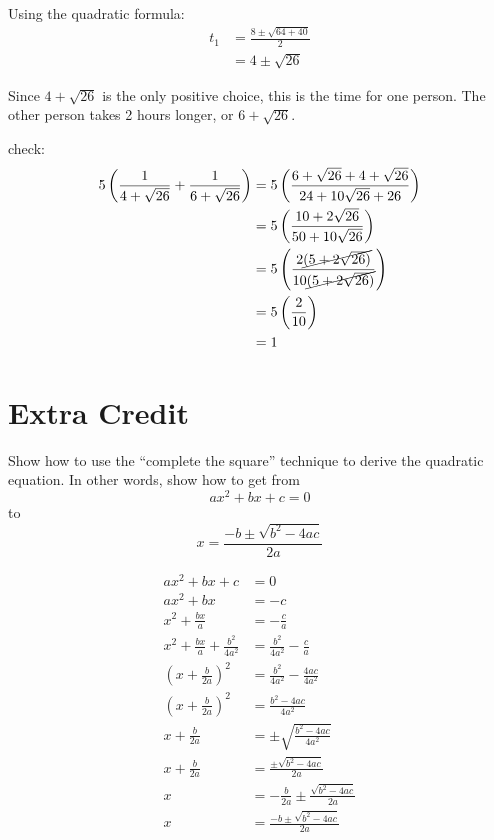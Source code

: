 \documentclass[fleqn,addpoints]{exam}
\begin{document}
\begin{questions}
\begin{solution}[9 cm]
Using the quadratic formula:
\begin{align*}
  t_1 &= \frac{8 \pm \sqrt{64+40}}{2} \\
  &= 4 \pm \sqrt{26}
\end{align*}

Since $4 + \sqrt{26}$ is the only positive choice, this is the
time for one person.  The other person takes 2 hours longer, or $6 + \sqrt{26}$.

check:
\begin{align*}
  5\left( \frac{1}{4+\sqrt{26}} + \frac{1}{6 + \sqrt{26}} \right) 
  &= 5 \left( \frac{6 + \sqrt{26} + 4 + \sqrt{26}}{24 + 10 \sqrt{26} + 26} \right) \\
  &= 5 \left( \frac{10 + 2 \sqrt{26}}{50 + 10 \sqrt{26}} \right) \\
  &= 5 \left( \frac{2 \cancel{(5 + 2 \sqrt{26})} }{10 \cancel{(5 + 2 \sqrt{26})}} \right) \\
  &= 5 \left( \frac{2}{10} \right) \\
  &= 1 \\
\end{align*}

\end{solution}

\pagebreak
\noaddpoints

\section{Extra Credit}
\question[10] 
Show how to use the ``complete the square'' technique to derive the quadratic equation.  In other words, show how to get
from 
\[ ax^2+bx+c=0 \] 
to 
\[ x = \dfrac{-b \pm \sqrt{b^2-4ac}}{2a} \]

\begin{solution}[6 cm]
\begin{align*}
  ax^2+bx+c &= 0 \\
  ax^2+bx &= -c \\
  x^2+\frac{bx}{a} &= -\frac{c}{a} \\
  x^2+\frac{bx}{a} + \frac{b^2}{4a^2} &=  \frac{b^2}{4a^2} -\frac{c}{a} \\
  \left( x + \frac{b}{2a} \right)^2 &= \frac{b^2}{4a^2} - \frac{4ac}{4a^2}  \\
  \left( x + \frac{b}{2a} \right)^2 &= \frac{b^2 - 4ac}{4a^2} \\
  x + \frac{b}{2a} &= \pm \sqrt{\frac{b^2 - 4ac}{4a^2}} \\
  x + \frac{b}{2a} &= \frac{\pm \sqrt{b^2 - 4ac}}{2a} \\
  x &= -\frac{b}{2a} \pm \frac{\sqrt{b^2 - 4ac}}{2a} \\
  x &= \frac{-b \pm \sqrt{b^2 - 4ac}}{2a} \\
\end{align*}
\end{solution}

\end{questions}
\end{document}
